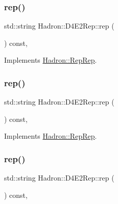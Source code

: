 \subsubsection{\texorpdfstring{rep()}{rep()}\hspace{0.1cm}{\footnotesize\ttfamily [3/5]}}
{\footnotesize\ttfamily std\+::string Hadron\+::\+D4\+E2\+Rep\+::rep (\begin{DoxyParamCaption}{ }\end{DoxyParamCaption}) const\hspace{0.3cm}{\ttfamily [inline]}, {\ttfamily [virtual]}}



Implements \mbox{\hyperlink{structHadron_1_1RepRep_ab3213025f6de249f7095892109575fde}{Hadron\+::\+Rep\+Rep}}.

\mbox{\label{structHadron_1_1D4E2Rep_aa3fbc4ce5b4a84a739b17fa4bc49e97d}} 
\subsubsection{\texorpdfstring{rep()}{rep()}\hspace{0.1cm}{\footnotesize\ttfamily [4/5]}}
{\footnotesize\ttfamily std\+::string Hadron\+::\+D4\+E2\+Rep\+::rep (\begin{DoxyParamCaption}{ }\end{DoxyParamCaption}) const\hspace{0.3cm}{\ttfamily [inline]}, {\ttfamily [virtual]}}



Implements \mbox{\hyperlink{structHadron_1_1RepRep_ab3213025f6de249f7095892109575fde}{Hadron\+::\+Rep\+Rep}}.

\mbox{\label{structHadron_1_1D4E2Rep_aa3fbc4ce5b4a84a739b17fa4bc49e97d}} 
\subsubsection{\texorpdfstring{rep()}{rep()}\hspace{0.1cm}{\footnotesize\ttfamily [5/5]}}
{\footnotesize\ttfamily std\+::string Hadron\+::\+D4\+E2\+Rep\+::rep (\begin{DoxyParamCaption}{ }\end{DoxyParamCaption}) const\hspace{0.3cm}{\ttfamily [inline]}, {\ttfamily [virtual]}}



